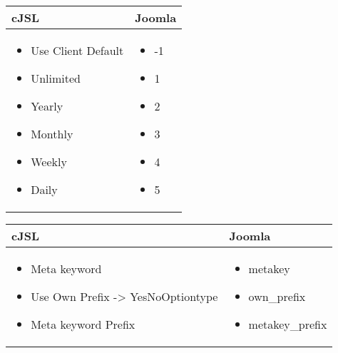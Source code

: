 \begin{minipage}{0.7\textwidth}
\begin{tabular}{|p{} | p{}|}
\hline
\textbf{cJSL} & \textbf{Joomla} \\ 
\hline
\begin{itemize}
\item Use Client Default 
\item Unlimited
\item Yearly
\item Monthly
\item Weekly
\item Daily
\end{itemize}
 & 
\begin{itemize}
\item -1
\item 1
\item 2
\item 3
\item 4
\item 5
\end{itemize}
\\
\hline
\end{tabular}
\end{minipage}

\begin{minipage}{0.7\textwidth}
\begin{tabular}{|p{} | p{}|}
\hline
\textbf{cJSL} & \textbf{Joomla} \\ 
\hline
\begin{itemize}
\item  Meta keyword
\item  Use Own Prefix  -> YesNoOptiontype
\item  Meta keyword Prefix
\end{itemize}
 & 
\begin{itemize}
\item  metakey
\item  own\_prefix
\item  metakey\_prefix
\end{itemize}
\\
\hline
\end{tabular}
\end{minipage}


